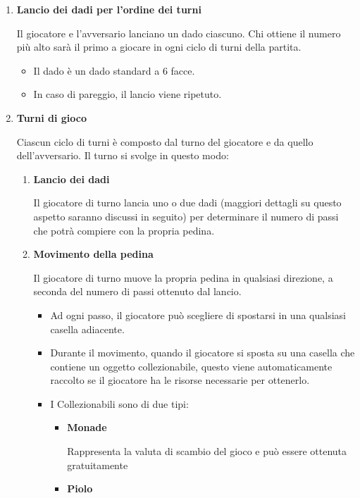 \begin{enumerate}
    \item \textbf{Lancio dei dadi per l'ordine dei turni}\par
    Il giocatore e l'avversario lanciano un dado ciascuno. Chi ottiene
    il numero più alto sarà il primo a giocare in ogni ciclo di turni della partita.
    \begin{itemize}
        \item Il dado è un dado standard a 6 facce.
        \item In caso di pareggio, il lancio viene ripetuto.
    \end{itemize}
    \item \textbf{Turni di gioco}\par
    Ciascun ciclo di turni è composto dal turno del giocatore e da quello dell'avversario.
    Il turno si svolge in questo modo:
    \begin{enumerate}
        \item \textbf{Lancio dei dadi}\par
        Il giocatore di turno lancia uno o due dadi 
        (maggiori dettagli su questo aspetto saranno 
        discussi in seguito) per determinare il numero di passi
        che potrà compiere con la propria pedina.
        \item \textbf{Movimento della pedina}\par
        Il giocatore di turno muove la propria pedina in qualsiasi
        direzione, a seconda del numero di passi ottenuto dal lancio.
        \begin{itemize}
            \item Ad ogni passo, il giocatore può scegliere di spostarsi
            in una qualsiasi casella adiacente.
            \item Durante il movimento, quando il giocatore si sposta
            su una casella che contiene un oggetto collezionabile, 
            questo viene automaticamente raccolto se il giocatore ha
            le risorse necessarie per ottenerlo.
            \item I Collezionabili sono di due tipi:
            \begin{itemize}
                \item \textbf{Monade}\par
                Rappresenta la valuta di scambio del gioco e può essere ottenuta gratuitamente
                \item \textbf{Piolo}\par

\end{itemize}
\end{itemize}
\end{enumerate}
\end{enumerate}
